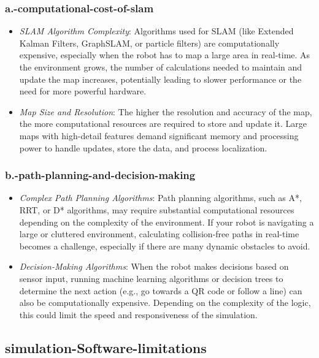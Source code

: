 \documentclass[../../main]{subfiles}
\begin{document}
    \subsubsection{a.-computational-cost-of-slam}

    \begin{itemize}
    \item
      \emph{SLAM Algorithm Complexity}: Algorithms used for SLAM (like
      Extended Kalman Filters, GraphSLAM, or particle filters) are
      computationally expensive, especially when the robot has to map a
      large area in real-time. As the environment grows, the number of
      calculations needed to maintain and update the map increases,
      potentially leading to slower performance or the need for more
      powerful hardware.
    \item
      \emph{Map Size and Resolution}: The higher the resolution and
      accuracy of the map, the more computational resources are required to
      store and update it. Large maps with high-detail features demand
      significant memory and processing power to handle updates, store the
      data, and process localization.
    \end{itemize}
    
    \subsubsection{b.-path-planning-and-decision-making}
    \begin{itemize}
    \item
      \emph{Complex Path Planning Algorithms}: Path planning algorithms,
      such as A*, RRT, or D* algorithms, may require substantial
      computational resources depending on the complexity of the
      environment. If your robot is navigating a large or cluttered
      environment, calculating collision-free paths in real-time becomes a
      challenge, especially if there are many dynamic obstacles to avoid.
    \item
      \emph{Decision-Making Algorithms}: When the robot makes decisions
      based on sensor input, running machine learning algorithms or decision
      trees to determine the next action (e.g., go towards a QR code or
      follow a line) can also be computationally expensive. Depending on the
      complexity of the logic, this could limit the speed and responsiveness
      of the simulation.
    \end{itemize}
    
    \subsection{simulation-Software-limitations}
    
\end{document}
